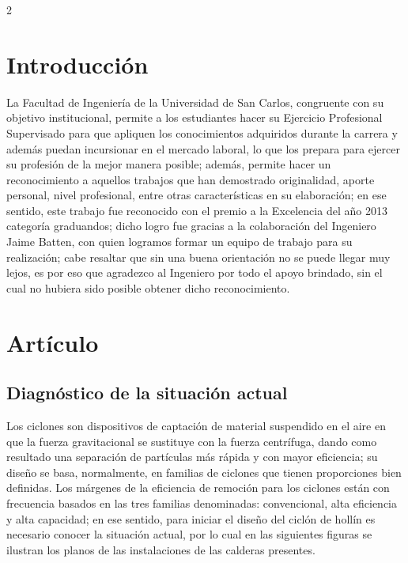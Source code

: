 \documentclass[12pt,spanish,Letterpaper,openany]{book}
\begin{document}
\begin {multicols}{2}

\hypertarget{introduccion-5}{%
\section{Introducción}\label{introduccion-5}}

La Facultad de Ingeniería de la Universidad de San Carlos, congruente con su objetivo institucional, permite a los estudiantes hacer su Ejercicio Profesional Supervisado para que apliquen los conocimientos adquiridos durante la carrera y además puedan incursionar en el mercado laboral, lo que los prepara para ejercer su profesión de la mejor manera posible; además, permite hacer un reconocimiento a aquellos trabajos que han demostrado originalidad, aporte personal, nivel profesional, entre otras características en su elaboración; en ese sentido, este trabajo fue reconocido con el premio a la Excelencia del año 2013 categoría graduandos; dicho logro fue gracias a la colaboración del Ingeniero Jaime Batten, con quien logramos formar un equipo de trabajo para su realización; cabe resaltar que sin una buena orientación no se puede llegar muy lejos, es por eso que agradezco al Ingeniero por todo el apoyo brindado, sin el cual no hubiera sido posible obtener dicho reconocimiento.

\hypertarget{articulo-4}{%
\section{Artículo}\label{articulo-4}}

\hypertarget{diagnostico-de-la-situacion-actual}{%
\subsection{Diagnóstico de la situación actual}\label{diagnostico-de-la-situacion-actual}}

Los ciclones son dispositivos de captación de material suspendido en el aire en que la fuerza gravitacional se sustituye con la fuerza centrífuga, dando como resultado una separación de partículas más rápida y con mayor eficiencia; su diseño se basa, normalmente, en familias de ciclones que tienen proporciones bien definidas. Los márgenes de la eficiencia de remoción para los ciclones están con frecuencia basados en las tres familias denominadas: convencional, alta eficiencia y alta capacidad; en ese sentido, para iniciar el diseño del ciclón de hollín es necesario conocer la situación actual, por lo cual en las siguientes figuras se ilustran los planos de las instalaciones de las calderas presentes.


\end{multicols}
\end{document}
